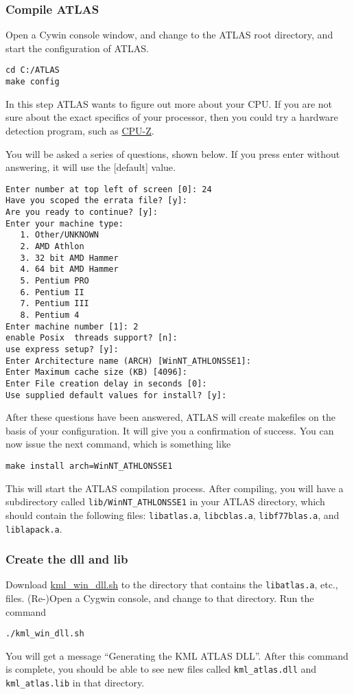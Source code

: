 \documentclass{article}
\begin{document}
\subsubsection{Compile ATLAS}

Open a Cywin console window, and change to the ATLAS root
directory, and start the configuration of ATLAS.

\begin{verbatim}
cd C:/ATLAS
make config
\end{verbatim}
%
In this step ATLAS wants to figure out more about your CPU.
If you are not sure about the exact specifics of your processor, then
you could try a hardware detection program, such as 
\href{http://www.cpuid.org/cpuz.php}{CPU-Z}.

You will be asked a series of questions, shown below. If you press enter 
without answering, it will use the [default] value. 
%
\begin{verbatim}
Enter number at top left of screen [0]: 24
Have you scoped the errata file? [y]:
Are you ready to continue? [y]:
Enter your machine type:
   1. Other/UNKNOWN
   2. AMD Athlon
   3. 32 bit AMD Hammer
   4. 64 bit AMD Hammer
   5. Pentium PRO
   6. Pentium II
   7. Pentium III
   8. Pentium 4
Enter machine number [1]: 2
enable Posix  threads support? [n]: 
use express setup? [y]:
Enter Architecture name (ARCH) [WinNT_ATHLONSSE1]:
Enter Maximum cache size (KB) [4096]:
Enter File creation delay in seconds [0]:
Use supplied default values for install? [y]:
\end{verbatim}
%
After these questions have been answered, ATLAS will create makefiles on the basis of your
configuration. It will give you a confirmation of success. You can now issue the next 
command, which is something like 
%
\begin{verbatim}
make install arch=WinNT_ATHLONSSE1
\end{verbatim}
%
This will start the ATLAS compilation process. After compiling, 
you will have a subdirectory called \texttt{lib/WinNT\_ATHLONSSE1} 
in your ATLAS directory, which should contain the following files: 
\texttt{libatlas.a}, \texttt{libcblas.a}, \texttt{libf77blas.a}, and 
\texttt{liblapack.a}.


\subsubsection{Create the dll and lib}

Download 
\href{research/kml/kml\_win\_dll.sh}{kml\_win\_dll.sh}
to the directory that contains the \texttt{libatlas.a}, etc., files.  
(Re-)Open a Cygwin console, and change to that directory. Run the command
\begin{verbatim}
./kml_win_dll.sh
\end{verbatim}
%
You will get a message ``Generating
the KML ATLAS DLL''. After this command is complete, you should be able to see new 
files called \texttt{kml\_atlas.dll} and \texttt{kml\_atlas.lib} in that directory.
\end{document}
